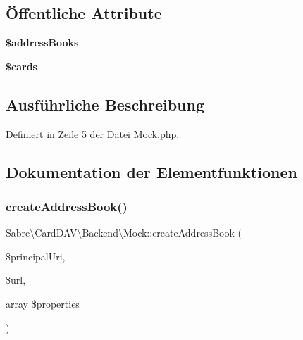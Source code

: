\subsection*{Öffentliche Attribute}
\begin{DoxyCompactItemize}
\item 
\mbox{\label{class_sabre_1_1_card_d_a_v_1_1_backend_1_1_mock_a56ca6f705d5b43675f8ee8046975e427}} 
{\bfseries \$address\+Books}
\item 
\mbox{\label{class_sabre_1_1_card_d_a_v_1_1_backend_1_1_mock_a6819033e03c1725f6251f166872fc081}} 
{\bfseries \$cards}
\end{DoxyCompactItemize}


\subsection{Ausführliche Beschreibung}


Definiert in Zeile 5 der Datei Mock.\+php.



\subsection{Dokumentation der Elementfunktionen}
\mbox{\label{class_sabre_1_1_card_d_a_v_1_1_backend_1_1_mock_aeaadfec8bfde286ae0db2af6d21e28b6}} 
\subsubsection{\texorpdfstring{create\+Address\+Book()}{createAddressBook()}}
{\footnotesize\ttfamily Sabre\textbackslash{}\+Card\+D\+A\+V\textbackslash{}\+Backend\textbackslash{}\+Mock\+::create\+Address\+Book (\begin{DoxyParamCaption}\item[{}]{\$principal\+Uri,  }\item[{}]{\$url,  }\item[{array}]{\$properties }\end{DoxyParamCaption})}

